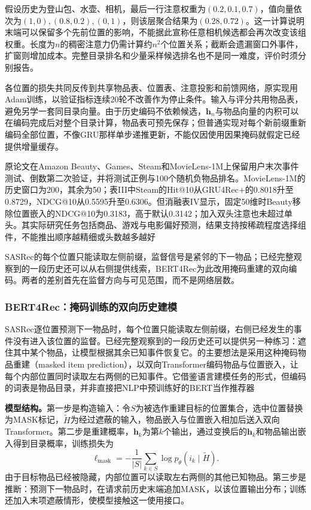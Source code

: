 假设历史为登山包、水壶、相机，最后一行注意权重为$(0.2,0.1,0.7)$，值向量依次为$(1,0),(0.8,0.2),(0,1)$，则该层聚合结果为$(0.28,0.72)$。这一计算说明末端可以保留多个先前位置的影响，不能据此宣称任意相机候选都会再次改变该组权重。长度为$n$的稠密注意力仍需计算约$n^2$个位置关系；截断会遗漏窗口外事件，扩窗则增加成本。完整目录排名和少量采样候选排名也不是同一难度，评价时须分别报告。

各位置的损失共同反传到共享物品表、位置表、注意投影和前馈网络，原实现用Adam训练，以验证指标连续20轮不改善作为停止条件。输入与评分共用物品表，避免另学一套同目录向量。由于历史编码不依赖候选，$\bm{h}_n$与物品向量的内积可以在编码完成后对整个目录计算，物品表可预先保存；但普通实现对每个新前缀重新编码全部位置，不像GRU那样单步递推更新，不能仅因使用因果掩码就假定已经提供增量缓存。

原论文在Amazon Beauty、Games、Steam和MovieLens-1M上保留用户末次事件测试、倒数第二次验证，并将测试正例与100个随机负物品排名。MovieLens-1M的历史窗口为200，其余为50；表III中Steam的Hit@10从GRU4Rec+的0.8018升至0.8729，NDCG@10从0.5595升至0.6306。但消融表IV显示，固定50维时Beauty移除位置嵌入的NDCG@10为0.3183，高于默认0.3142；加入双头注意也未超过单头。其实际研究任务包括商品、游戏与电影偏好预测，结果支持按稀疏程度选择组件，不能推出顺序越精细或头数越多越好

SASRec的每个位置只能读取左侧前缀，监督信号是紧邻的下一物品；已经完整观察到的一段历史还可以从右侧提供线索，BERT4Rec为此改用掩码重建的双向编码。两者的差别首先在监督方向与可见范围，而不是网络层数。
\subsubsection{BERT4Rec：掩码训练的双向历史建模}
\label{sec:rs-bert4rec}

SASRec逐位置预测下一物品时，每个位置只能读取左侧前缀，右侧已经发生的事件没有进入该位置的监督。已经完整观察到的一段历史还可以提供另一种练习：遮住其中某个物品，让模型根据其余已知事件恢复它。的主要想法是采用这种掩码物品重建（masked item prediction），以双向Transformer编码物品与位置嵌入，让每个内部位置同时读取左右两侧的已知事件。它借鉴语言建模任务的形式，但编码的词表是物品目录，并非直接把NLP中预训练好的BERT当作推荐器

\textbf{模型结构。}第一步是构造输入：令$S$为被选作重建目标的位置集合，选中位置替换为MASK标记，$\widetilde H$为经过遮蔽的输入，物品嵌入与位置嵌入相加后送入双向Transformer。第二步是重建概率，$\bm{h}_k$为第$k$个输出，通过变换后的$\bm{h}_k$和物品输出嵌入得到目录概率，训练损失为
\begin{equation}
  \ell_{\mathrm{mask}}
    =-\frac{1}{|S|}\sum_{k\in S}
        \log p_\theta(i_k\mid\widetilde H).
  \label{eq:rs-bert4rec-mask}
\end{equation}
由于目标物品已经被隐藏，内部位置可以读取左右两侧的其他已知物品。第三步是推断：预测下一物品时，在请求前历史末端追加MASK，以该位置输出分布；训练还加入末项遮蔽情形，使模型接触这一使用接口。

